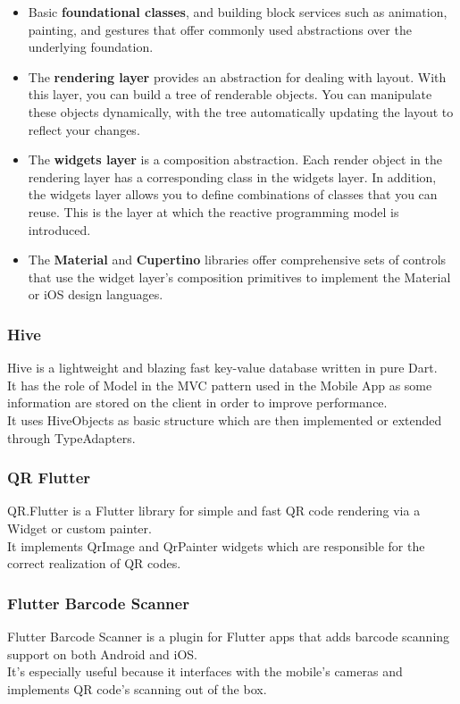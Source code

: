 \documentclass[table, 12pt]{article}
\begin{document}
\begin{itemize}
    \item Basic \textbf{foundational classes}, and building block services such as animation, painting, and gestures that offer commonly used abstractions over the underlying foundation.
    \item The \textbf{rendering layer} provides an abstraction for dealing with layout. With this layer, you can build a tree of renderable objects. You can manipulate these objects dynamically, with the tree automatically updating the layout to reflect your changes.
    \item The \textbf{widgets layer} is a composition abstraction. Each render object in the rendering layer has a corresponding class in the widgets layer. In addition, the widgets layer allows you to define combinations of classes that you can reuse. This is the layer at which the reactive programming model is introduced.
    \item The \textbf{Material} and \textbf{Cupertino} libraries offer comprehensive sets of controls that use the widget layer’s composition primitives to implement the Material or iOS design languages.
\end{itemize}
\subsubsection{Hive}
Hive is a lightweight and blazing fast key-value database written in pure Dart.\\
It has the role of Model in the MVC pattern used in the Mobile App as some information are stored on the client in order to improve performance.\\
It uses HiveObjects as basic structure which are then implemented or extended through TypeAdapters.
\subsubsection{QR Flutter}
QR.Flutter is a Flutter library for simple and fast QR code rendering via a Widget or custom painter.\\
It implements QrImage and QrPainter widgets which are responsible for the correct realization of QR codes.
\subsubsection{Flutter Barcode Scanner}
Flutter Barcode Scanner is a plugin for Flutter apps that adds barcode scanning support on both Android and iOS.\\
It's especially useful because it interfaces with the mobile's cameras and implements QR code's scanning out of the box.
\end{document}
